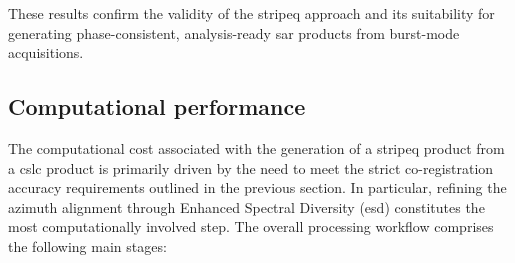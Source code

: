 These results confirm the validity of the \acs{stripeq} approach and its suitability for generating phase-consistent, analysis-ready \acs{sar} products from burst-mode acquisitions.

\subsection{Computational performance}
\label{sec:stripeq_computation}

The computational cost associated with the generation of a \acs{stripeq} product from a \acs{cslc} product is primarily driven by the need to meet the strict co-registration accuracy requirements outlined in the previous section. In particular, refining the azimuth alignment through Enhanced Spectral Diversity (\acs{esd}) constitutes the most computationally involved step. The overall processing workflow comprises the following main stages:

